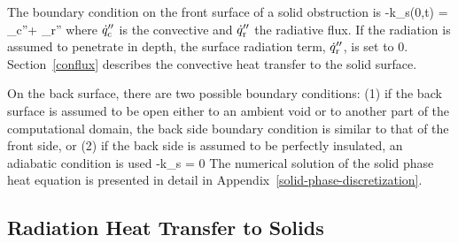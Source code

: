 The boundary condition on the front surface of a solid obstruction is
\be
 -k_{\rm s}(0,t) = _{\rm c}''+ _{\rm r}''
\ee
where $\dot{q}_{\rm c}''$ is the convective and $\dot{q}_{\rm r}''$ the radiative flux. If the radiation is assumed to penetrate in depth, the surface radiation term, $\dot{q}_{\rm r}''$, is set to 0. Section~\ref{conflux} describes the convective heat transfer to the solid surface.

On the back surface, there are two possible boundary conditions: (1) if the back surface is assumed to be open either to an ambient void or to another part of the computational domain, the back side boundary condition is similar to that of the front side, or (2) if the back side is assumed to be perfectly insulated, an adiabatic condition is used
\be
 -k_{\rm s} = 0
\ee
The numerical solution of the solid phase heat equation is presented in detail in Appendix~\ref{solid-phase-discretization}.

\subsection{Radiation Heat Transfer to Solids}
\label{inradsection}

